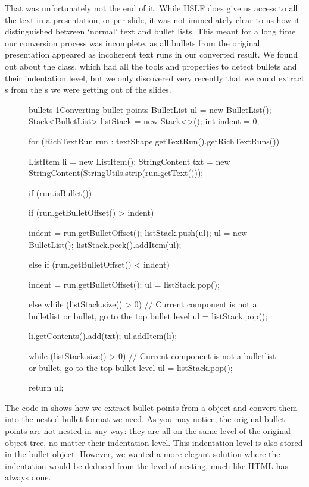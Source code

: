     That was unfortunately not the end of it. While HSLF does give us access to
    all the text in a presentation, or per slide, it was not immediately clear
    to us how it distinguished between `normal' text and bullet lists. This
    meant for a long time our conversion process was incomplete, as all bullets
    from the original \ppt presentation appeared as incoherent text runs in our
    converted result. We found out about the  class, which
    had all the tools and properties to detect bullets and their indentation
    level, but we only discovered very recently that we could extract
    s from the s we were getting out of the
    slides.

     \begin{figure}[h!]
      \begin{lstjava}{bullets-1}{Converting bullet points}
BulletList ul = new BulletList();
Stack<BulletList> listStack = new Stack<>();
int indent = 0;

for (RichTextRun run : textShape.getTextRun().getRichTextRuns()) {
  ListItem li = new ListItem();
  StringContent txt = new StringContent(StringUtils.strip(run.getText()));

  if (run.isBullet()) {
    if (run.getBulletOffset() > indent) {

      indent = run.getBulletOffset();
      listStack.push(ul);
      ul = new BulletList();
      listStack.peek().addItem(ul);

    } else if (run.getBulletOffset() < indent) {

      indent = run.getBulletOffset();
      ul = listStack.pop();

    }
  } else {
    while (listStack.size() > 0) {
//  Current component is not a bulletlist or bullet, go to the top bullet level
      ul = listStack.pop();
    }
  }

  li.getContents().add(txt);
  ul.addItem(li);
}

while (listStack.size() > 0) {
  // Current component is not a bulletlist or bullet, go to the top bullet level
  ul = listStack.pop();
}

return ul;
      \end{lstjava}
     \end{figure}

    The code in  shows how we extract bullet points from a
     object and convert them into the nested bullet format we
    need. As you may notice, the original bullet points are not nested in any
    way: they are all on the same level of the original object tree, no matter
    their indentation level. This indentation level is also stored in the
    bullet object. However, we wanted a more elegant solution where the
    indentation would be deduced from the level of nesting, much like HTML has
    always done.

